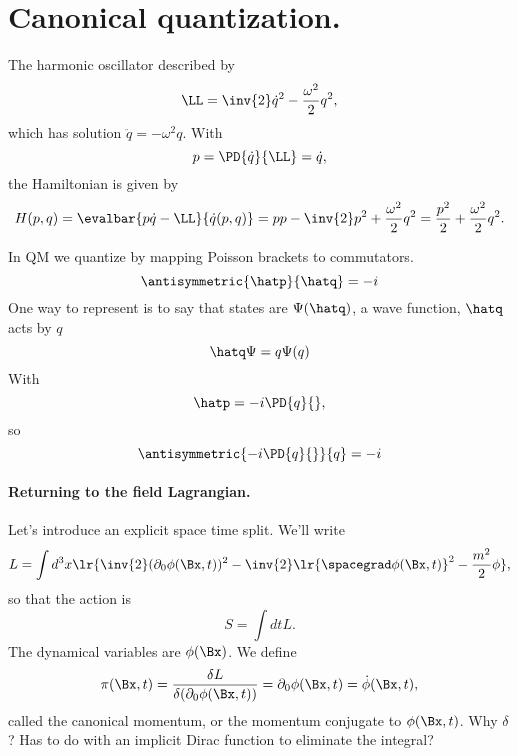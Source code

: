 %
%
\section{Canonical quantization.}

The harmonic oscillator described by
\begin{dmath}\label{eqn:qftLecture4:740}
\LL = \inv{2} \dot{q}^2 - \frac{\omega^2}{2} q^2,
\end{dmath}
which has solution \(\ddot{q} = - \omega^2 q\).
With
\begin{equation}\label{eqn:qftLecture4:760}
p = \PD{\dot{q}}{\LL} = \dot{q},
\end{equation}
the Hamiltonian is given by
\begin{dmath}\label{eqn:qftLecture4:780}
H(p,q) = \evalbar{p \dot{q} - \LL}{\dot{q}(p, q)}
= p p - \inv{2} p^2 + \frac{\omega^2}{2} q^2 = \frac{p^2}{2} + \frac{\omega^2}{2} q^2.
\end{dmath}

In QM we quantize by mapping Poisson brackets to commutators.
\begin{dmath}\label{eqn:qftLecture4:800}
\antisymmetric{\hatp}{\hatq} = -i
\end{dmath}
One way to represent is to say that states are \( \Psi(\hatq) \), a wave function, \( \hatq \) acts by \( q \)
\begin{dmath}\label{eqn:qftLecture4:820}
\hatq \Psi = q \Psi(q)
\end{dmath}
With
\begin{dmath}\label{eqn:qftLecture4:840}
\hatp = -i \PD{q}{},
\end{dmath}
so
\begin{dmath}\label{eqn:qftLecture4:860}
\antisymmetric{ -i \PD{q}{} } { q} = -i
\end{dmath}

\paragraph{Returning to the field Lagrangian.}

Let's introduce an explicit space time split.  We'll write
\begin{dmath}\label{eqn:qftLecture4:880}
L = \int d^3 x \lr{
\inv{2} (\partial_0 \phi(\Bx, t))^2 - \inv{2} \lr{ \spacegrad \phi(\Bx, t) }^2 - \frac{m^2}{2} \phi
},
\end{dmath}
so that the action is
\begin{dmath}\label{eqn:qftLecture4:900}
S = \int dt L.
\end{dmath}
The dynamical variables are \( \phi(\Bx) \).  We define
\begin{dmath}\label{eqn:qftLecture4:920}
\pi(\Bx, t) = \frac{\delta L}{\delta (\partial_0 \phi(\Bx, t))}
=
\partial_0 \phi(\Bx, t)
=
\dot{\phi}(\Bx, t),
\end{dmath}
called the canonical momentum, or the momentum conjugate to \( \phi(\Bx, t) \).
Why \( \delta \)?  Has to do with an implicit Dirac function to eliminate the integral?

